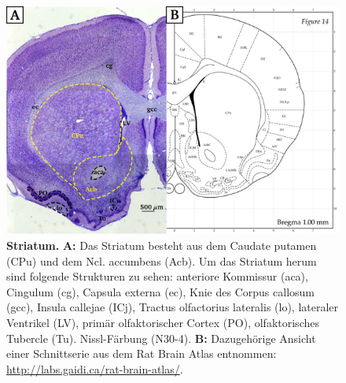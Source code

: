 \begin{figure}[H]
    \centering
    \includegraphics{pictures/Basalganglia/Nucleus_acumbens.png}
    \caption[Striatum]{\textbf{Striatum.} \textbf{A:} Das Striatum besteht aus dem Caudate putamen (CPu) und dem Ncl. accumbens (Acb). Um das Striatum herum sind folgende Strukturen zu sehen: anteriore Kommissur (aca), Cingulum (cg), Capsula externa (ec), Knie des Corpus callosum (gcc), Insula callejae (ICj), Tractus olfactorius lateralis (lo), lateraler Ventrikel (LV), primär olfaktorischer Cortex (PO), olfaktorisches Tubercle (Tu). Nissl-Färbung (N30-4). \textbf{B:} Dazugehörige Ansicht einer Schnittserie aus dem Rat Brain Atlas entnommen: \url{http://labs.gaidi.ca/rat-brain-atlas/}.}
    \label{fig:Nucleus_accumbens}
\end{figure}

\newpage
